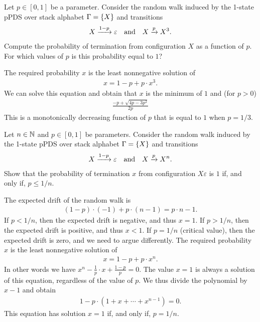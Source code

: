 \begin{exercise}
    Let $p \in [0, 1]$ be a parameter.
    Consider the random walk induced by the 1-state pPDS
    over stack alphabet $\Gamma = \left\{X\right\}$ and transitions
    \begin{align*}
        X \xrightarrow{1-p} \varepsilon
            \quad\text{and}\quad
                X \xrightarrow{p} X^3.
    \end{align*}
    Compute the probability of termination from configuration $X$ as a function of $p$.
    For which values of $p$ is this probability equal to $1$?
\end{exercise}
\begin{solution}
    The required probability $x$ is the least nonnegative solution of
    \begin{align*}
        x = 1 - p + p \cdot x^3.
    \end{align*}
    We can solve this equation and obtain that $x$ is the minimum of $1$ and (for $p > 0$)
    \begin{align*}
        \frac { -p + \sqrt{4 p - 3 p^2} } {2 p}
    \end{align*}
    This is a monotonically decreasing function of $p$
    that is equal to $1$ when $p = 1/3$.
\end{solution}

\begin{exercise}
    Let $n \in \mathbb N$ and $p \in [0, 1]$ be parameters.
    Consider the random walk induced by the 1-state pPDS
    over stack alphabet $\Gamma = \left\{X\right\}$ and transitions
    \begin{align*}
        X \xrightarrow{1-p} \varepsilon
            \quad\text{and}\quad
                X \xrightarrow{p} X^n.
    \end{align*}
    Show that the probability of termination $x$ from configuration $X\varepsilon$ is $1$
    if, and only if, $p \leq 1 / n$.
\end{exercise}
\begin{solution}
    The expected drift of the random walk is
    \begin{align*}
        (1-p) \cdot (-1) + p \cdot (n-1) = p \cdot n - 1.
    \end{align*}
    If $p < 1/n$, then the expected drift is negative, and thus $x = 1$.
    If $p > 1/n$, then the expected drift is positive, and thus $x < 1$.
    If $p = 1/n$ (critical value), then the expected drift is zero, and we need to argue differently.
    The required probability $x$ is the least nonnegative solution of
    \begin{align*}
        x = 1 - p + p \cdot x^n.
    \end{align*}
    In other words we have $x^n - \frac 1 p \cdot x + \frac {1 - p} p = 0$.
    The value $x = 1$ is always a solution of this equation, regardless of the value of $p$.
    We thus divide the polynomial by $x - 1$ and obtain
    \begin{align*}
        1 - p \cdot (1 + x + \cdots + x^{n-1}) = 0.
    \end{align*}
    This equation has solution $x = 1$ if, and only if, $p = 1/n$.
\end{solution}

